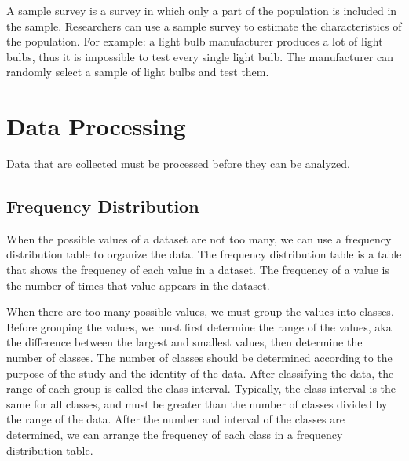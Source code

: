 \documentclass{report}
\begin{document}
\begin{multicols}{2}
  A sample survey is a survey in which only a part of the population is included
  in the sample. Researchers can use a sample survey to estimate the
  characteristics of the population. For example: a light bulb manufacturer
  produces a lot of light bulbs, thus it is impossible to test every single light
  bulb. The manufacturer can randomly select a sample of light bulbs and test
  them.

  \section{Data Processing}

  Data that are collected must be processed before they can be analyzed.

  \subsection*{Frequency Distribution}

  When the possible values of a dataset are not too many, we can use a frequency
  distribution table to organize the data. The frequency distribution table is a
  table that shows the frequency of each value in a dataset. The frequency of a
  value is the number of times that value appears in the dataset.

  When there are too many possible values, we must group the values into classes.
  Before grouping the values, we must first determine the range of the values,
  aka the difference between the largest and smallest values, then determine the
  number of classes. The number of classes should be determined according to the
  purpose of the study and the identity of the data. After classifying the data,
  the range of each group is called the class interval. Typically, the class
  interval is the same for all classes, and must be greater than the number of
  classes divided by the range of the data. After the number and interval of the
  classes are determined, we can arrange the frequency of each class in a
  frequency distribution table.


\end{multicols}
\end{document}
